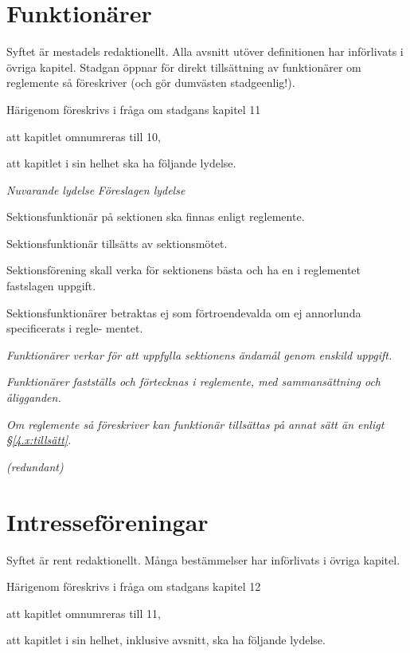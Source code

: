 \documentclass{article}
\newenvironment{lydelse}
    {\begin{paracol}{2}%
        \emph{Nuvarande lydelse}%
        \switchcolumn%
        \emph{Föreslagen lydelse}%
    \end{paracol}%
    \begin{enumerate}[label=\thesubsection.\arabic*]%
    \begin{paracol}{2}%
    }{\end{paracol}\end{enumerate}}
\begin{document}
\section{Funktionärer}
Syftet är mestadels redaktionellt.
Alla avsnitt utöver definitionen har införlivats i övriga kapitel.
Stadgan öppnar för direkt tillsättning av funktionärer om reglemente så föreskriver (och gör dumvästen stadgeenlig!).

Härigenom föreskrivs i fråga om stadgans kapitel 11
\begin{dels}
\item att kapitlet omnumreras till 10,
\item att kapitlet i sin helhet ska ha följande lydelse.
\end{dels}

\begin{lydelse}
  \setcounter{section}{11}
  \setcounter{subsection}{1}
\item Sektionsfunktionär på sektionen ska finnas enligt reglemente.
\item Sektionsfunktionär tillsätts av sektionsmötet.
\item Sektionsförening skall verka för sektionens bästa och ha en i reglementet fastslagen uppgift.
\item Sektionsfunktionärer betraktas ej som förtroendevalda om ej annorlunda specificerats i regle-
mentet.
\switchcolumn
\setcounter{section}{10}
\item \emph{Funktionärer verkar för att uppfylla sektionens ändamål genom enskild uppgift.}
\item \emph{Funktionärer fastställs och förtecknas i reglemente, med sammansättning och åligganden.}
\item \emph{Om reglemente så föreskriver kan funktionär tillsättas på annat sätt än enligt \S\ref{4.x:tillsätt}.}
\item[] \emph{(redundant)}
\end{lydelse}
\setcounter{section}{10}

\section{Intresseföreningar}
Syftet är rent redaktionellt.
Många bestämmelser har införlivats i övriga kapitel.

Härigenom föreskrivs i fråga om stadgans kapitel 12
\begin{dels}
\item att kapitlet omnumreras till 11,
\item att kapitlet i sin helhet, inklusive avsnitt, ska ha följande lydelse.
\end{dels}
\end{document}
